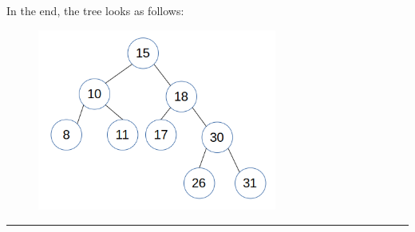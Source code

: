 \documentclass{article}
\begin{document}
\begin{enumerate}
In the end, the tree looks as follows:

\begin{figure}[H]
	\includegraphics[width=0.7\textwidth]{P11/final}
\end{figure}
\noindent\rule{8cm}{0.4pt}


\end{enumerate}
\end{document}
